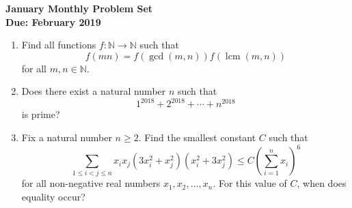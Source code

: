 \documentclass{article}
\DeclareMathOperator{\lcm}{lcm}
\begin{document}
\begin{center}
\textbf{\Large January Monthly Problem Set}
\\ \vspace{1em}
\textbf{\large Due: February 2019}
\end{center}

\begin{enumerate}[1.]

\vspace{5mm}
\item
Find all functions $f : \mathbb{N} \to \mathbb{N}$ such that
\[
	f(mn) = f(\gcd(m, n)) f(\lcm(m, n))
\]
for all $m, n \in \mathbb{N}$.


\vspace{5mm}
\item
Does there exist a natural number $n$ such that
\[
	1^{2018} + 2^{2018} + \cdots + n^{2018}
\]
is prime?


\vspace{5mm}
\item %
Fix a natural number $n \geq 2$. Find the smallest constant $C$ such that
\[
	 \sum_{1 \leq i < j \leq n} x_i x_j (3x_i^2 + x_j^2)(x_i^2 + 3x_j^2) \leq C {\left( \sum_{i = 1}^{n} x_i \right)}^6
\]
for all non-negative real numbers $x_1, x_2, \dots, x_n$. For this value of $C$, when does equality occur?

\end{enumerate}
\end{document}

